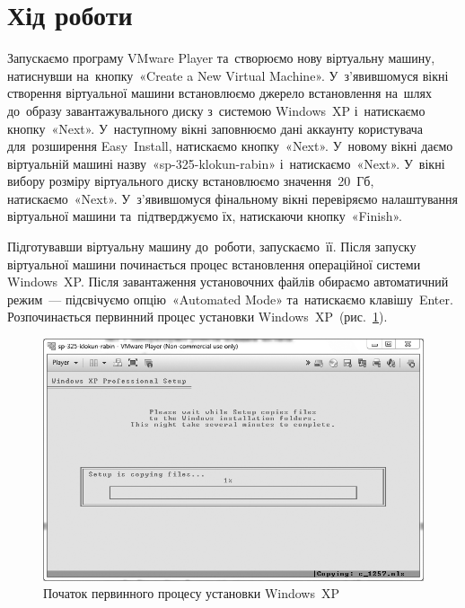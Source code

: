 \documentclass[
	a4paper,
	oneside,
	DIV = 12,
	12pt,
	headings = normal,
]{scrartcl}
\begin{document}
	\section{Хід роботи}
		Запускаємо програму VMware Player та~створюємо нову віртуальну машину, натиснувши на~кнопку~«Create a New Virtual Machine». У~з'я\-вив\-шо\-муся вікні створення віртуальної машини встановлюємо джерело встановлення на~шлях до~образу завантажувального диску з~системою Windows~XP і~натискаємо кнопку~«Next». У~наступному вікні заповнюємо дані аккаунту користувача для~розширення Easy~Install, натискаємо кнопку~«Next». У~новому вікні даємо віртуальній машині назву~«sp-325-klokun-rabin» і~натискаємо~«Next». У~вікні вибору розміру віртуального диску встановлюємо значення~20~Гб, натискаємо~«Next». У~з'явившомуся фінальному вікні перевіряємо налаштування віртуальної машини та~підтверджуємо їх, натискаючи кнопку~«Finish». 
		
		Підготувавши віртуальну машину до~роботи, запускаємо~її. Після запуску віртуальної машини починається процес встановлення операційної системи Windows~XP. Після завантаження установочних файлів обираємо автоматичний режим~— підсвічуємо опцію~«Automated Mode» та~натискаємо клавішу~Enter. Розпочинається первинний процес установки Windows~XP~(рис.~\ref{fig:01-winxp-install-primary}).
		\begin{figure}[!htbp]
			\centering
			\includegraphics[height = 7\baselineskip]{./assets/y03s01-pcdiag-lab-01-01-bw.png}
			\caption{Початок первинного процесу установки Windows~XP}
			\label{fig:01-winxp-install-primary}
		\end{figure}
\end{document}
